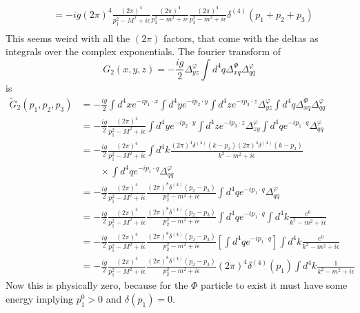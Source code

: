 \documentclass[12pt,a4]{article}
\begin{document}
\begin{enumerate}
\begin{enumerate}
\begin{enumerate}
\begin{align*}
                                        &= -ig (2 \pi)^{4} \frac{(2 \pi)^{4}}{p_1^2 - M^2 + i \epsilon} \frac{(2 \pi)^{4}}{p_2^2 - m^2 + i \epsilon}\frac{(2 \pi)^{4}}{p_3^2 - m^2 + i \epsilon}\delta^{(4)}(p_1 + p_2 + p_3)\\
            \end{align*}
            This seems weird with all the $(2\pi)$ factors, that come with the deltas as integrals over the complex exponentials.
            The fourier transform of
            \begin{equation*}
               G_2(x, y, z) = -\frac{ig}{2}\Delta^{\varphi}_{yz}\int d^4 q\Delta^{\Phi}_{xq} \Delta^{\varphi}_{qq}
            \end{equation*}
            is
            \begin{align*}
              \tilde G_2(p_1, p_2, p_3) &= -\frac{ig}{2}\int d^4x e^{-i p_1\cdot x}\int d^4y e^{-i p_2\cdot y}\int d^4z e^{-i p_3\cdot z}\Delta^{\varphi}_{yz}\int d^4 q\Delta^{\Phi}_{xq} \Delta^{\varphi}_{qq}\\
                                        &= -\frac{ig}{2}\frac{(2\pi)^4}{p_1^2 - M^2 + i \epsilon} \int d^4y e^{-i p_2\cdot y}\int d^4z e^{-i p_3\cdot z}\Delta^{\varphi}_{zy}\int d^4 q e^{-ip_1\cdot  q} \Delta^{\varphi}_{qq}\\
                                        &= -\frac{ig}{2}\frac{(2\pi)^4}{p_1^2 - M^2 + i \epsilon} \int d^4 k\frac{(2 \pi)^4\delta^{(4)}(k - p_2)(2 \pi)^4\delta^{(4)}(k - p_3)}{k^2 - m^2 + i \epsilon}\\
                                        & \qquad \times \int d^4 q e^{-ip_1\cdot  q} \Delta^{\varphi}_{qq}\\
                                        &= -\frac{ig}{2}\frac{(2\pi)^4}{p_1^2 - M^2 + i \epsilon} \frac{(2 \pi)^8\delta^{(4)}(p_2 - p_3)}{p_2^2 - m^2 + i \epsilon}\int d^4 q e^{-ip_1\cdot  q} \Delta^{\varphi}_{qq}\\
                                        &= -\frac{ig}{2}\frac{(2\pi)^4}{p_1^2 - M^2 + i \epsilon} \frac{(2 \pi)^8\delta^{(4)}(p_2 - p_3)}{p_2^2 - m^2 + i \epsilon}\int d^4 q e^{-ip_1\cdot  q} \int d^4k\frac{e^0}{k^2 - m^2 + i \epsilon}\\
                                        &= -\frac{ig}{2}\frac{(2\pi)^4}{p_1^2 - M^2 + i \epsilon} \frac{(2 \pi)^8\delta^{(4)}(p_2 - p_3)}{p_2^2 - m^2 + i \epsilon}\left[ \int d^4 q e^{-ip_1\cdot  q}\right]\int d^4k\frac{e^0}{k^2 - m^2 + i \epsilon}\\
                                        &= -\frac{ig}{2}\frac{(2\pi)^4}{p_1^2 - M^2 + i \epsilon} \frac{(2 \pi)^8\delta^{(4)}(p_2 - p_3)}{p_2^2 - m^2 + i \epsilon}(2\pi)^4\delta^{(4)}(p_1)\int d^4k\frac{1}{k^2 - m^2 + i \epsilon}
            \end{align*}
            Now this is physically zero, because for the $\Phi$ particle to exist it must have some energy implying $p_1^0 > 0$ and $\delta(p_1) = 0$.



\end{enumerate}
\end{enumerate}
\end{enumerate}
\end{document}
